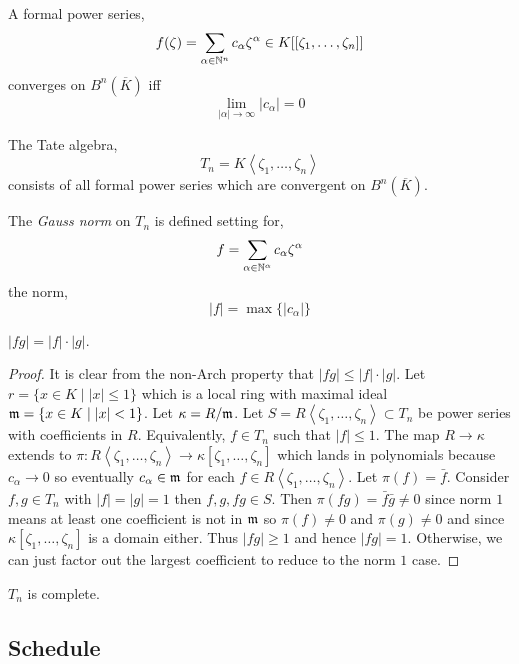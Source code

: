 \documentclass[12pt]{article}
\begin{document}
\begin{lemma}
A formal power series,
\[ f(\zeta) = \sum_{\alpha \in \mathbb{N}^n} c_\alpha \zeta^\alpha \in K[[\zeta_1, \dots, \zeta_n]] \]
converges on $B^n(\overline{K})$ iff
\[ \lim_{|\alpha| \to \infty} | c_\alpha | = 0 \]
\end{lemma}

\begin{defn}
The Tate algebra,
\[ T_n = K \left< \zeta_1, \dots, \zeta_n \right> \]
consists of all formal power series which are convergent on $B^n(\overline{K})$. 
\end{defn}

\begin{defn}
The \textit{Gauss norm} on $T_n$ is defined setting for,
\[ f = \sum_{\alpha \in \mathbb{N}^\alpha} c_\alpha \zeta^\alpha \]
the norm,
\[ |f| = \max \{ |c_{\alpha} | \} \]
\end{defn}

\begin{lemma}
$|fg| = |f| \cdot |g|$. 
\end{lemma}

\begin{proof}
It is clear from the non-Arch property that $|fg| \le |f| \cdot |g|$. Let $r = \{ x \in K \mid |x| \le 1 \}$ which is a local ring with maximal ideal $\mathfrak{m} = \{ x \in K \mid |x| < 1 \}$. Let $\kappa = R / \mathfrak{m}$. Let $S = R \left< \zeta_1, \dots, \zeta_n \right> \subset T_n$ be power series with coefficients in $R$. Equivalently, $f \in T_n$ such that $|f| \le 1$. The map $R \to \kappa$ extends to $\pi : R \left< \zeta_1, \dots, \zeta_n \right> \to \kappa[\zeta_1, \dots, \zeta_n]$ which lands in polynomials because $c_\alpha \to 0$ so eventually $c_\alpha \in \mathfrak{m}$ for each $f \in R \left< \zeta_1, \dots, \zeta_n \right>$. Let $\pi(f) = \bar{f}$. Consider $f,g \in T_n$ with $|f| = |g| = 1$ then $f,g, fg \in S$. Then $\pi(fg) = \bar{f} \bar{g} \neq 0$ since norm $1$ means at least one coefficient is not in $\mathfrak{m}$ so $\pi(f) \neq 0$ and $\pi(g) \neq 0$ and since $\kappa[\zeta_1, \dots, \zeta_n]$ is a domain either. Thus $|fg| \ge 1$ and hence $|fg| = 1$. Otherwise, we can just factor out the largest coefficient to reduce to the norm $1$ case. 
\end{proof}

\begin{prop}
$T_n$ is complete. 
\end{prop}

\subsection{Schedule}
\end{document}
